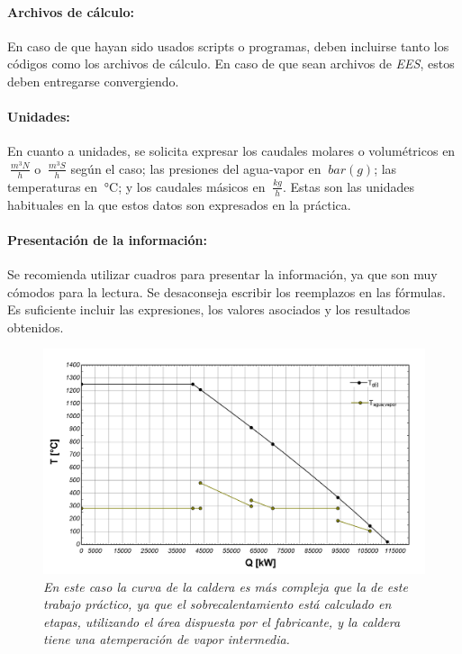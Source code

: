 \paragraph{Archivos de cálculo:}

En caso de que hayan sido usados scripts o programas, deben incluirse tanto los códigos como los archivos de cálculo. En caso de que sean archivos de \textit{EES}, estos deben entregarse convergiendo.

\paragraph{Unidades:}

En cuanto a unidades, se solicita expresar los caudales molares o volumétricos en $\SI{}{\frac{m^3N}{h}}$ o $\SI{}{\frac{m^3S}{h}}$ según el caso; las presiones del agua-vapor en $\SI{}{bar(g)}$; las temperaturas en $\SI{}{\celsius}$; y los caudales másicos en $\SI{}{\frac{kg}{h}}$. Estas son las unidades habituales en la que estos datos son expresados en la práctica.

\paragraph{Presentación de la información:} Se recomienda utilizar cuadros para presentar la información, ya que son muy cómodos para la lectura. Se desaconseja escribir los reemplazos en las fórmulas. Es suficiente incluir las expresiones, los valores asociados y los resultados obtenidos.


\begin{figure}[ht]
	\centerline{\includegraphics[scale=0.15]{graph_01.png}}
	\caption{\textit{En este caso la curva de la caldera es más compleja que la de este trabajo práctico, ya que el sobrecalentamiento está calculado en etapas, utilizando el área dispuesta por el fabricante, y la caldera tiene una atemperación de vapor intermedia.}}
	\label{im:TQ}
\end{figure}


